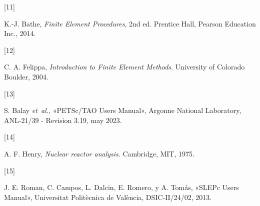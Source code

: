\documentclass[
  12pt,
  a4paper,
  table]{scrbook}
\newlength{\cslhangindent}
\newlength{\csllabelwidth}
\newlength{\cslentryspacingunit} %
\newenvironment{CSLReferences}[2] %
 {%
  \setlength{\parindent}{0pt}
  \ifodd #1
  \let\oldpar\par
  \def\par{\hangindent=\cslhangindent\oldpar}
  \fi
  \setlength{\parskip}{#2\cslentryspacingunit}
 }%
 {}
\newcommand{\CSLLeftMargin}[1]{\parbox[t]{\csllabelwidth}{#1}}
\newcommand{\CSLRightInline}[1]{\parbox[t]{\linewidth - \csllabelwidth}{#1}\break}
\theoremstyle{plain}
\theoremstyle{definition}
\theoremstyle{plain}
\theoremstyle{plain}
\theoremstyle{remark}
\begin{document}
\begin{CSLReferences}{0}{0}
\leavevmode{}%
\CSLLeftMargin{{[}11{]} }%
\CSLRightInline{K.-J. Bathe, \emph{Finite Element Procedures}, 2nd ed.
Prentice Hall, Pearson Education Inc., 2014.}

\leavevmode{}%
\CSLLeftMargin{{[}12{]} }%
\CSLRightInline{C. A. Felippa, \emph{Introduction to Finite Element
Methods}. University of Colorado Boulder, 2004.}

\leavevmode{}%
\CSLLeftMargin{{[}13{]} }%
\CSLRightInline{S. Balay \emph{et~al.}, {«{PETSc}/{TAO} Users Manual»},
Argonne National Laboratory, ANL-21/39 - Revision 3.19, may 2023.}

\leavevmode{}%
\CSLLeftMargin{{[}14{]} }%
\CSLRightInline{A. F. Henry, \emph{Nuclear reactor analysis}. Cambridge,
MIT, 1975.}

\leavevmode{}%
\CSLLeftMargin{{[}15{]} }%
\CSLRightInline{J. E. Roman, C. Campos, L. Dalcin, E. Romero, y A.
Tomás, {«{SLEP}c Users Manual»}, Universitat Politècnica de València,
DSIC-II/24/02, 2013.}

\end{CSLReferences}


\backmatter
\end{document}
